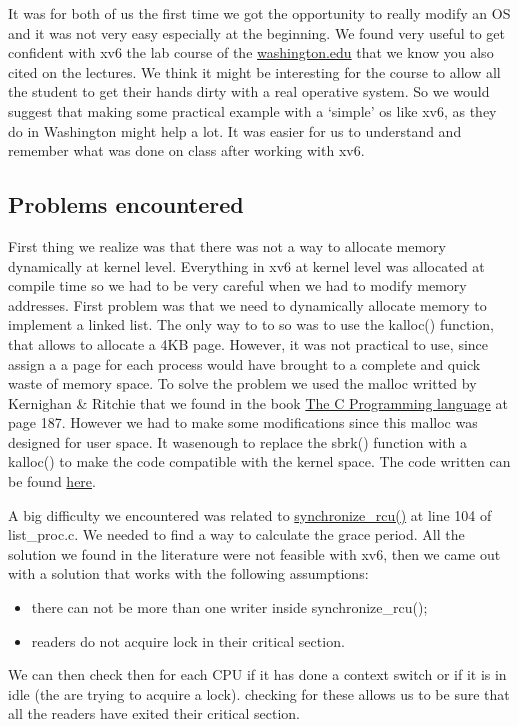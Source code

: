 \documentclass[10pt,a4]{article}
\begin{document}
It was for both of us the first time we got the opportunity to really modify an OS and it was not very easy especially at the beginning. We found very useful to get confident with xv6 the lab course of the \href{https://courses.cs.washington.edu/courses/csep551/19au/labs/}{washington.edu} that we know you also cited on the lectures. We think it might be interesting for the course to allow all the student to get their hands dirty with a real operative system. So we would suggest that making some practical example with a ‘simple’ os like xv6, as they do in Washington might  help a lot. It was easier for us to understand and remember what was done on class after working with xv6.

\subsection{Problems encountered}

First thing we realize was that there was not a way to allocate memory dynamically at kernel level. Everything in xv6 at kernel level was allocated at compile time so we had to be very careful when we had to modify memory addresses. First problem was that we need to dynamically allocate memory to implement a linked list. The only way to to so was to use the kalloc() function, that allows to allocate a 4KB page. However, it was not practical to use, since assign a a page for each process would have brought to a complete and quick waste of memory space. To solve the problem we used the malloc writted by Kernighan \& Ritchie that we found in the book \href{https://kremlin.cc/k&r.pdf}{The C Programming language} at page 187. However we had to make some modifications since this malloc was designed for user space. It wasenough to replace the sbrk() function with a kalloc() to make the code compatible with the kernel space. The code written can be found \href{https://github.com/salvoM/xv6-riscv-rcu/blob/final/kernel/kmalloc.c}{here}.

A big difficulty we encountered was related to \href{https://github.com/salvoM/xv6-riscv-rcu/blob/final/kernel/list_proc.c}{synchronize\_rcu()} at line 104 of list\_proc.c. We needed to find a way to calculate the grace period. All the solution we found in the literature were not feasible with xv6, then we came out with a solution that works with the following assumptions:
\begin{itemize}
    \item there can not be more than one writer inside synchronize\_rcu();
    \item readers do not acquire lock in their critical section.
\end{itemize}
We can then check then for each CPU if it has done a context switch or if it is in idle (the are trying to acquire a lock). checking for these allows us to be sure that all the readers have exited their critical section.
\end{document}
